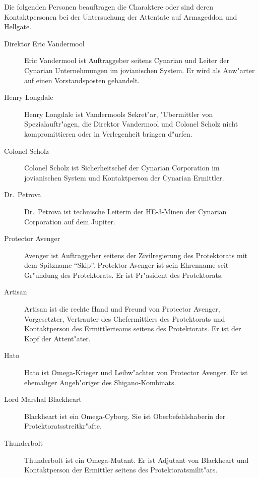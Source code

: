
Die folgenden Personen beauftragen die Charaktere oder sind deren Kontaktpersonen bei der Untersuchung der Attentate auf Armageddon und Hellgate.


\begin{description}
    \item [Direktor Eric Vandermool] Eric Vandermool ist Auftraggeber seitens Cynarian und Leiter der Cynarian Unternehmungen im 
        jovianischen System. Er wird als Anw"arter auf einen Vorstandsposten gehandelt.
    \item [Henry Longdale] Henry  Longdale ist Vandermools Sekret"ar, "Ubermittler von Spezialauftr"agen, die Direktor Vandermool und 
        Colonel Scholz nicht kompromittieren oder in Verlegenheit bringen d"urfen.
    \item [Colonel Scholz] Colonel Scholz ist Sicherheitschef der Cynarian Corporation im jovianischen System und Kontaktperson der 
        Cynarian Ermittler.
    \item [Dr.~Petrova] Dr.~Petrova ist technische Leiterin der HE-3-Minen der Cynarian Corporation auf dem Jupiter.
\end{description}


\begin{description}
    \item [Protector Avenger] Avenger ist Auftraggeber seitens der Zivilregierung des Protektorats mit dem Spitzname ``Skip''. Protektor 
        Avenger ist sein Ehrenname seit Gr"undung des Protektorats. Er ist Pr"asident des Protektorats.
    \item [Artisan] Artisan ist die rechte Hand und Freund von Protector Avenger, Vorgesetzter, Vertrauter des Chefermittlers des 
        Protektorats und Kontaktperson des Ermittlerteams seitens des Protektorats. Er ist der Kopf der Attent"ater. 
    \item [Hato] Hato ist Omega-Krieger und Leibw"achter von Protector Avenger. Er ist ehemaliger Angeh"origer des Shigano-Kombinats.
    \item [Lord Marshal Blackheart] Blackheart ist ein Omega-Cyborg. Sie ist Oberbefehlshaberin der Protektoratsstreitkr"afte.
    \item [Thunderbolt] Thunderbolt ist ein Omega-Mutant. Er ist Adjutant von Blackheart und Kontaktperson der Ermittler seitens des 
        Protektoratsmilit"ars.
\end{description}
